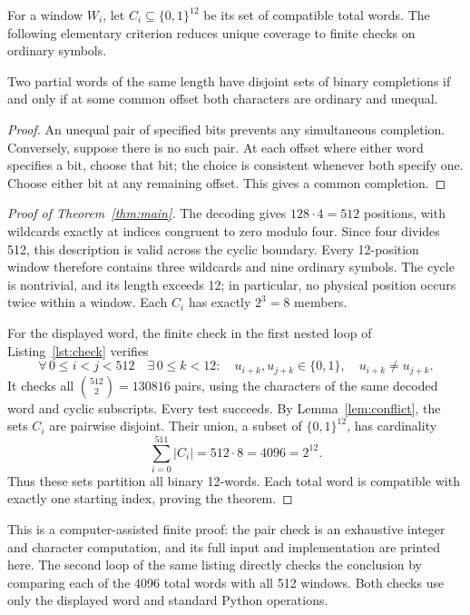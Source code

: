 \documentclass[acmsmall,nonacm,11pt,natbib=false]{acmart}
\begin{document}
For a window $W_i$, let $C_i\subseteq\{0,1\}^{12}$ be its set of
compatible total words. The following elementary criterion reduces unique
coverage to finite checks on ordinary symbols.

\begin{lemma}\label{lem:conflict}
Two partial words of the same length have disjoint sets of binary
completions if and only if at some common offset both characters are
ordinary and unequal.
\end{lemma}
\begin{proof}
An unequal pair of specified bits prevents any simultaneous completion.
Conversely, suppose there is no such pair. At each offset where either
word specifies a bit, choose that bit; the choice is consistent whenever
both specify one. Choose either bit at any remaining offset. This gives a
common completion.
\end{proof}

\begin{proof}[Proof of Theorem~\ref{thm:main}]
The decoding gives $128\cdot4=512$ positions, with wildcards exactly at
indices congruent to zero modulo four. Since four divides 512, this
description is valid across the cyclic boundary. Every 12-position window
therefore contains three wildcards and nine ordinary symbols. The cycle
is nontrivial, and its length exceeds 12; in particular, no physical
position occurs twice within a window. Each $C_i$ has exactly $2^3=8$
members.

For the displayed word, the finite check in the first nested loop of
Listing~\ref{lst:check} verifies
\begin{equation}\label{eq:conflict}
  \forall\,0\leq i<j<512\quad\exists\,0\leq k<12:\quad
  u_{i+k},u_{j+k}\in\{0,1\},\quad u_{i+k}\ne u_{j+k}.
\end{equation}
It checks all $\binom{512}{2}=130816$ pairs, using the characters of the
same decoded word and cyclic subscripts. Every test succeeds. By
Lemma~\ref{lem:conflict}, the sets $C_i$ are pairwise disjoint. Their
union, a subset of $\{0,1\}^{12}$, has cardinality
\[
  \sum_{i=0}^{511}|C_i|=512\cdot8=4096=2^{12}.
\]
Thus these sets partition all binary 12-words. Each total word is
compatible with exactly one starting index, proving the theorem.
\end{proof}

This is a computer-assisted finite proof: the pair check is an exhaustive
integer and character computation, and its full input and implementation
are printed here. The second loop of the same listing directly checks the
conclusion by comparing each of the 4096 total words with all 512 windows.
Both checks use only the displayed word and standard Python operations.
\end{document}
